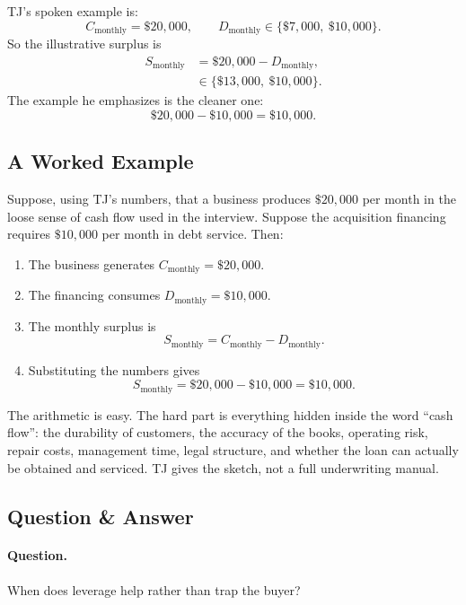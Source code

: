 TJ's spoken example is:
\begin{equation}
C_{\mathrm{monthly}} = \$20{,}000,
\qquad
D_{\mathrm{monthly}} \in \{\$7{,}000,\ \$10{,}000\}.
\end{equation}
So the illustrative surplus is
\begin{align}
S_{\mathrm{monthly}}
  &= \$20{,}000 - D_{\mathrm{monthly}},\\
  &\in \{\$13{,}000,\ \$10{,}000\}.
\end{align}
The example he emphasizes is the cleaner one:
\begin{equation}
\$20{,}000 - \$10{,}000 = \$10{,}000.
\end{equation}

\subsection{A Worked Example}

Suppose, using TJ's numbers, that a business produces \(\$20{,}000\) per month in the loose sense of cash flow used in the interview. Suppose the acquisition financing requires \(\$10{,}000\) per month in debt service. Then:
\begin{enumerate}
\item The business generates \(C_{\mathrm{monthly}}=\$20{,}000\).
\item The financing consumes \(D_{\mathrm{monthly}}=\$10{,}000\).
\item The monthly surplus is
\[
S_{\mathrm{monthly}} = C_{\mathrm{monthly}} - D_{\mathrm{monthly}}.
\]
\item Substituting the numbers gives
\[
S_{\mathrm{monthly}} = \$20{,}000 - \$10{,}000 = \$10{,}000.
\]
\end{enumerate}

The arithmetic is easy. The hard part is everything hidden inside the word ``cash flow'': the durability of customers, the accuracy of the books, operating risk, repair costs, management time, legal structure, and whether the loan can actually be obtained and serviced. TJ gives the sketch, not a full underwriting manual.

\subsection{Question \& Answer}

\paragraph{Question.} When does leverage help rather than trap the buyer?

